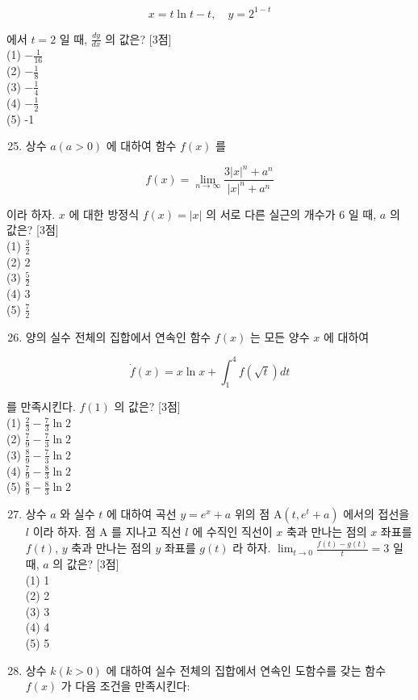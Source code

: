 \documentclass[10pt]{article}
\begin{document}
\[
x=t \ln t-t, \quad y=2^{1-t}
\]

에서 $t=2$ 일 때, $\frac{d y}{d x}$ 의 값은? [3점]\\
(1) $-\frac{1}{16}$\\
(2) $-\frac{1}{8}$\\
(3) $-\frac{1}{4}$\\
(4) $-\frac{1}{2}$\\
(5) -1

\begin{enumerate}
  \setcounter{enumi}{24}
  \item 상수 $a(a>0)$ 에 대하여 함수 $f(x)$ 를
\end{enumerate}

\[
f(x)=\lim _{n \rightarrow \infty} \frac{3|x|^{n}+a^{n}}{|x|^{n}+a^{n}}
\]

이라 하자. $x$ 에 대한 방정식 $f(x)=|x|$ 의 서로 다른 실근의 개수가 6 일 때, $a$ 의 값은? [3점]\\
(1) $\frac{3}{2}$\\
(2) 2\\
(3) $\frac{5}{2}$\\
(4) 3\\
(5) $\frac{7}{2}$

\begin{enumerate}
  \setcounter{enumi}{25}
  \item 양의 실수 전체의 집합에서 연속인 함수 $f(x)$ 는 모든 양수 $x$ 에 대하여
\end{enumerate}

\[
\dot{f}(x)=x \ln x+\int_{1}^{4} f(\sqrt{t}) d t
\]

를 만족시킨다. $f(1)$ 의 값은? [3점]\\
(1) $\frac{2}{3}-\frac{7}{3} \ln 2$\\
(2) $\frac{7}{9}-\frac{7}{3} \ln 2$\\
(3) $\frac{8}{9}-\frac{7}{3} \ln 2$\\
(4) $\frac{7}{9}-\frac{8}{3} \ln 2$\\
(5) $\frac{8}{9}-\frac{8}{3} \ln 2$

\begin{enumerate}
  \setcounter{enumi}{26}
  \item 상수 $a$ 와 실수 $t$ 에 대하여 곡선 $y=e^{x}+a$ 위의 점 $\mathrm{A}\left(t, e^{t}+a\right)$ 에서의 접선을 $l$ 이라 하자. 점 A 를 지나고 직선 $l$ 에 수직인 직선이 $x$ 축과 만나는 점의 $x$ 좌표를 $f(t)$, $y$ 축과 만나는 점의 $y$ 좌표를 $g(t)$ 라 하자. $\lim _{t \rightarrow 0} \frac{f(t)-g(t)}{t}=3$ 일 때, $a$ 의 값은? [3점]\\
(1) 1\\
(2) 2\\
(3) 3\\
(4) 4\\
(5) 5

  \item 상수 $k(k>0)$ 에 대하여 실수 전체의 집합에서 연속인 도함수를 갖는 함수 $f(x)$ 가 다음 조건을 만족시킨다:

\end{enumerate}
\end{document}
